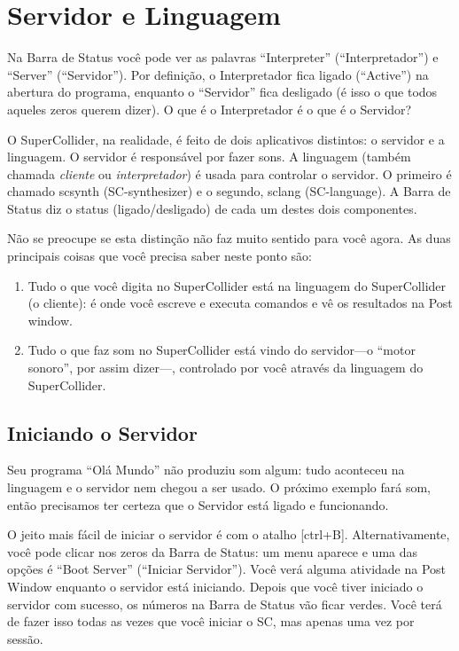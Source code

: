 \section{Servidor e Linguagem}

Na Barra de Status você pode ver as palavras “Interpreter” (“Interpretador”) e “Server” (“Servidor”). Por definição, o Interpretador fica ligado (“Active”) na abertura do programa, enquanto o “Servidor” fica desligado (é isso o que todos aqueles zeros querem dizer). O que é o Interpretador é o que é o Servidor?

O SuperCollider, na realidade, é feito de dois aplicativos distintos: o servidor e a linguagem. O servidor é responsável por fazer sons. A linguagem (também chamada \emph{cliente} ou \emph{interpretador}) é usada para controlar o servidor. O primeiro é chamado scsynth (SC-synthesizer) e o segundo, sclang (SC-language). A Barra de Status diz o status (ligado/desligado) de cada um destes dois componentes.

Não se preocupe se esta distinção não faz muito sentido para você agora. As duas principais coisas que você precisa saber neste ponto são:

\begin{enumerate}
\item Tudo o que você digita no SuperCollider está na linguagem do SuperCollider (o cliente): é onde você escreve e executa comandos e vê os resultados na Post window.
\item Tudo o que faz som no SuperCollider está vindo do servidor---o “motor sonoro”, por assim dizer---, controlado por você através da linguagem do SuperCollider.
\end{enumerate}

\subsection{Iniciando o Servidor}
Seu programa “Olá Mundo” não produziu som algum: tudo aconteceu na linguagem e o servidor nem chegou a ser usado. O próximo exemplo fará som, então precisamos ter certeza que o Servidor está ligado e funcionando.

O jeito mais fácil de iniciar o servidor é com o atalho [ctrl+B]. Alternativamente, você pode clicar nos zeros da Barra de Status: um menu aparece e uma das opções é “Boot Server” (“Iniciar Servidor”). Você verá alguma atividade na Post Window enquanto o servidor está iniciando. Depois que você tiver iniciado o servidor com sucesso, os números na Barra de Status vão ficar verdes. Você terá de fazer isso todas as vezes que você iniciar o SC, mas apenas uma vez por sessão.


